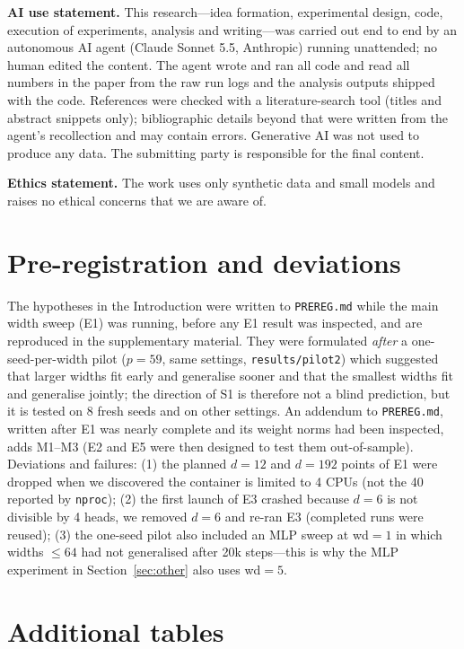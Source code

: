 \documentclass{article} %
\newcommand{\tgen}{t_{\mathrm{gen}}}
\begin{document}
\textbf{AI use statement.} This research---idea formation, experimental design, code, execution of experiments, analysis and writing---was carried out end to end by an autonomous AI agent (Claude Sonnet 5.5, Anthropic) running unattended; no human edited the content. The agent wrote and ran all code and read all numbers in the paper from the raw run logs and the analysis outputs shipped with the code. References were checked with a literature-search tool (titles and abstract snippets only); bibliographic details beyond that were written from the agent's recollection and may contain errors. Generative AI was not used to produce any data. The submitting party is responsible for the final content.

\textbf{Ethics statement.} The work uses only synthetic data and small models and raises no ethical concerns that we are aware of.




\appendix
\section{Pre-registration and deviations}
\label{app:prereg}
The hypotheses in the Introduction were written to \texttt{PREREG.md} while the main width sweep (E1) was running, before any E1 result was inspected, and are reproduced in the supplementary material. They were formulated \emph{after} a one-seed-per-width pilot ($p{=}59$, same settings, \texttt{results/pilot2}) which suggested that larger widths fit early and generalise sooner and that the smallest widths fit and generalise jointly; the direction of S1 is therefore not a blind prediction, but it is tested on 8 fresh seeds and on other settings. An addendum to \texttt{PREREG.md}, written after E1 was nearly complete and its weight norms had been inspected, adds M1--M3 (E2 and E5 were then designed to test them out-of-sample). Deviations and failures: (1) the planned $d{=}12$ and $d{=}192$ points of E1 were dropped when we discovered the container is limited to 4 CPUs (not the 40 reported by \texttt{nproc}); (2) the first launch of E3 crashed because $d{=}6$ is not divisible by 4 heads, we removed $d{=}6$ and re-ran E3 (completed runs were reused); (3) the one-seed pilot also included an MLP sweep at wd$=1$ in which widths $\le64$ had not generalised after 20k steps---this is why the MLP experiment in Section~\ref{sec:other} also uses wd$=5$.

\section{Additional tables}
\begin{table}[h]
\caption{Optimiser clock (E2), medians over 3 seeds per cell. ``--'': no run generalised. clock $=\tgen\cdot$lr$\cdot$wd; $\|\theta\|_{\mathrm{gen}}$: mean norm at $\tgen$ over generalising runs.}
\label{tab:e2}
\begin{center}\small

\end{center}
\end{table}
\end{document}
